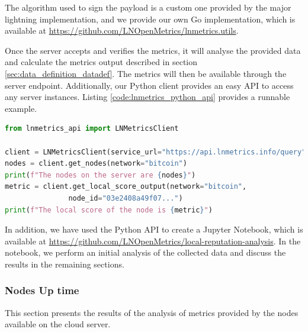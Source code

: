 The algorithm used to sign the payload is a custom one provided by the major
lightning implementation, and we provide our own Go implementation, which is available
at \url{https://github.com/LNOpenMetrics/lnmetrics.utils}.

Once the server accepts and verifies the metrics, it will analyse the provided data and calculate the
metrics output described in section \ref{sec:data_definition_datadef}. The metrics will then be available
through the server endpoint. Additionally, our Python client provides an easy API to access any server instances.
Listing \ref{code:lnmetrics_python_api} provides a runnable example.

\begin{lstlisting}[language=python, basicstyle=\small,
                  caption={Python script to show a runnable example of our Python wrapper API usage.}, 
                  label={code:lnmetrics_python_api}]
from lnmetrics_api import LNMetricsClient

client = LNMetricsClient(service_url="https://api.lnmetrics.info/query")
nodes = client.get_nodes(network="bitcoin")
print(f"The nodes on the server are {nodes}")
metric = client.get_local_score_output(network="bitcoin", 
               node_id="03e2408a49f07...")
print(f"The local score of the node is {metric}")
\end{lstlisting}

In addition, we have used the Python API to create a Jupyter Notebook, which 
is available at \url{https://github.com/LNOpenMetrics/local-reputation-analysis}.
In the notebook, we perform an initial analysis of the collected data and discuss 
the results in the remaining sections.

\subsubsection{Nodes Up time}
\label{sec:node_uptime}
This section presents the results of the analysis of metrics provided by the
nodes available on the cloud server.

